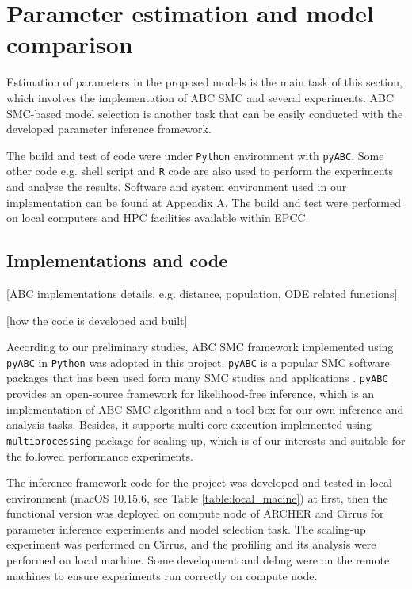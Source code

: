 \chapter{Parameter estimation and model comparison}

Estimation of  parameters in the proposed models is the main task of this section, which involves the implementation of ABC SMC and several experiments. ABC SMC-based model selection is another task that can be easily conducted with the developed parameter inference framework.

The build and test of code were under \verb|Python| environment with \verb|pyABC|\cite{ref:pyabc}. Some other code e.g. shell script and \verb|R| code are also used to perform the experiments and analyse the results. Software and system environment used in our implementation can be found at Appendix A. The build and test were performed on local computers and HPC facilities available within EPCC.






\section{Implementations and code}

 [ABC implementations details, e.g. distance, population, ODE related functions]

 [how the code is developed and built]

According to our preliminary studies, ABC SMC framework implemented using \verb|pyABC| in \verb|Python| was adopted in this project. \verb|pyABC| is a popular SMC software packages \cite{ref:pyabc} that has been used form many SMC studies and applications \cite{population}. \verb|pyABC| provides an open-source framework for likelihood-free inference, which is an implementation of ABC SMC algorithm and a tool-box for our own inference and analysis tasks. Besides, it supports multi-core execution implemented using \verb|multiprocessing| package for scaling-up, which is of our interests and suitable for the followed performance experiments.

The inference framework code for the project was developed and tested in local environment (macOS 10.15.6, see Table \ref{table:local_macine}) at first, then the functional version was deployed on compute node of ARCHER and Cirrus for parameter inference experiments and model selection task. The scaling-up experiment was performed on Cirrus, and the profiling and its analysis were performed on local machine. Some development and debug were on the remote machines to ensure experiments run correctly on compute node.

